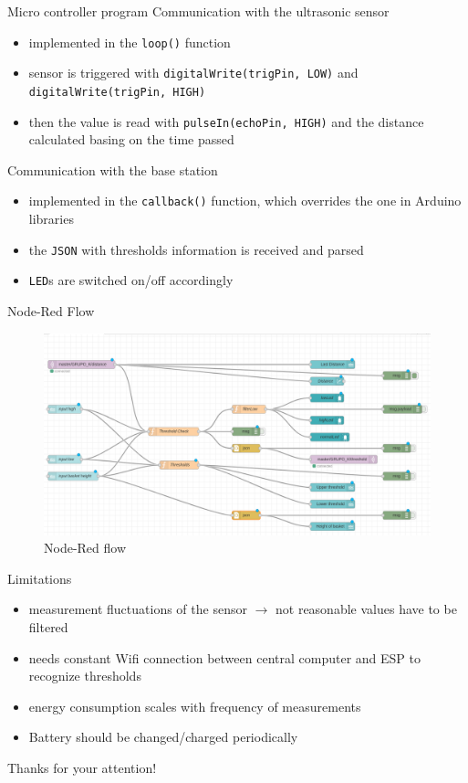 \documentclass[11pt]{beamer}
\begin{document}
\begin{frame}{Micro controller program}
  Communication with the ultrasonic sensor
  \begin{itemize}
  \item implemented in the \texttt{loop()} function
  \item sensor is triggered with \texttt{digitalWrite(trigPin, LOW)} and
    \texttt{digitalWrite(trigPin, HIGH)}
  \item then the value is read with \texttt{pulseIn(echoPin, HIGH)} and the distance
    calculated basing on the time passed
  \end{itemize}
  Communication with the base station
  \begin{itemize}
    \item implemented in the \texttt{callback()} function, which overrides the
      one in Arduino libraries
    \item the \texttt{JSON} with thresholds information is received and parsed
    \item \texttt{LED}s are switched on/off accordingly
  \end{itemize}
\end{frame}


\begin{frame}{Node-Red Flow}
\begin{figure}
\hspace*{-0.6cm}\includegraphics[scale=1.1]{pic/flowScheme.png}
\caption{Node-Red flow}
\label{flow}
\end{figure}
\end{frame}

\begin{frame}{Limitations}
\begin{itemize}
\item measurement fluctuations of the sensor $\to$ not reasonable values have to be filtered
\item needs constant Wifi connection between central computer and ESP to recognize thresholds
\item energy consumption scales with frequency of measurements
\item Battery should be changed/charged periodically
\end{itemize}
\end{frame}

\begin{frame}{}
\center
\huge{Thanks for your attention!}
\end{frame}
\end{document}
